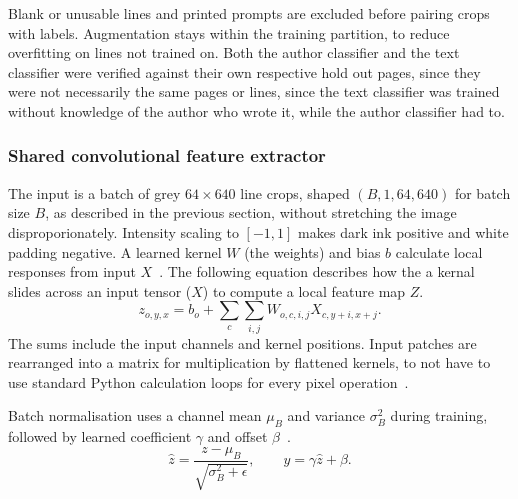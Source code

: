 Blank or unusable lines and printed prompts are excluded before pairing crops with labels. Augmentation stays within the training partition, to reduce overfitting on lines not trained on. Both the author classifier and the text classifier were verified against their own respective hold out pages, since they were not necessarily the same pages or lines, since the text classifier was trained without knowledge of the author who wrote it, while the author classifier had to.

\subsubsection{Shared convolutional feature extractor}
The input is a batch of grey $64\times640$ line crops, shaped $(B,1,64,640)$ for batch size $B$, as described in the previous section, without stretching the image disproporionately. Intensity scaling to $[-1,1]$ makes dark ink positive and white padding negative. A learned kernel $W$ (the weights) and bias $b$ calculate local responses from input $X$~\cite[pp.~6--8]{lecun1998}. The following equation describes how the a kernal slides across an input tensor ($X$) to compute a local feature map $Z$.
\begin{equation}
z_{o,y,x}=b_o+\sum_c\sum_{i,j}W_{o,c,i,j}X_{c,y+i,x+j}.
\label{eq:des-conv}
\end{equation}
The sums include the input channels and kernel positions. Input patches are rearranged into a matrix for multiplication by flattened kernels, to not have to use standard Python calculation loops for every pixel operation~\cite{chellapilla2006}.

Batch normalisation uses a channel mean $\mu_B$ and variance $\sigma_B^2$ during training, followed by learned coefficient $\gamma$ and offset $\beta$~\cite[pp.~4--5]{ioffe2015}.
\begin{equation}
\widehat z=\frac{z-\mu_B}{\sqrt{\sigma_B^2+\epsilon}},\qquad
y=\gamma\widehat z+\beta.
\label{eq:des-bn}
\end{equation}

